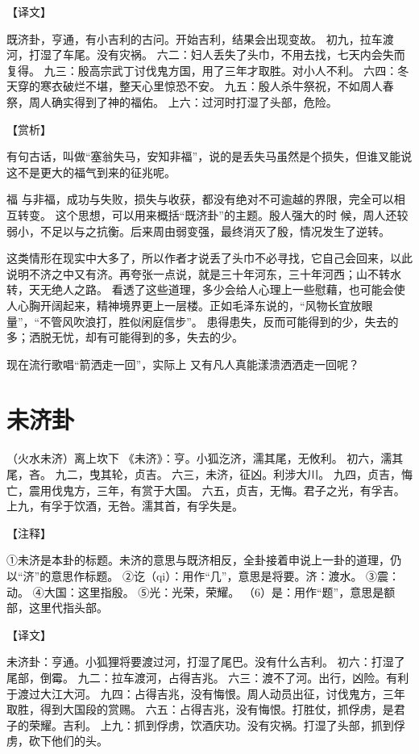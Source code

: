 \documentclass[12pt,UTF8]{ctexbook}
\begin{document}
【译文】

既济卦，亨通，有小吉利的古问。开始吉利，结果会出现变故。
初九，拉车渡河，打湿了车尾。没有灾祸。
六二：妇人丢失了头巾，不用去找，七天内会失而复得。
九三：殷高宗武丁讨伐鬼方国，用了三年才取胜。对小人不利。
六四：冬天穿的寒衣破烂不堪，整天心里惊恐不安。
九五：殷人杀牛祭祝，不如周人春祭，周人确实得到了神的福佑。
上六：过河时打湿了头部，危险。

【赏析】

有句古话，叫做“塞翁失马，安知非福”，说的是丢失马虽然是个损失，但谁叉能说这不是更大的福气到来的征兆呢。

福 与非福，成功与失败，损失与收获，都没有绝对不可逾越的界限，完全可以相互转变。 这个思想，可以用来概括“既济卦”的主题。殷人强大的时 候，周人还较弱小，不足以与之抗衡。后来周由弱变强，最终消灭了殷，情况发生了逆转。

这类情形在现实中大多了，所以作者才说丢了头巾不必寻找，它自己会回来，以此说明不济之中又有济。再夸张一点说，就是三十年河东，三十年河西；山不转水转，天无绝人之路。 看透了这些道理，多少会给人心理上一些慰藉，也可能会使人心胸开阔起来，精神境界更上一层楼。正如毛泽东说的，“风物长宜放眼量”，“不管风吹浪打，胜似闲庭信步”。 患得患失，反而可能得到的少，失去的多；洒脱无忧，却有可能得到的多，失去的少。

现在流行歌唱“箭洒走一回”，实际上 又有凡人真能漾溃洒洒走一回呢？

\chapter{未济卦}

（火水未济）离上坎下
《未济》：亨。小狐汔济，濡其尾，无攸利。
初六，濡其尾，吝。
九二，曳其轮，贞吉。
六三，未济，征凶。利涉大川。
九四，贞吉，悔亡，震用伐鬼方，三年，有赏于大国。
六五，贞吉，无悔。君子之光，有孚吉。
上九，有孚于饮酒，无咎。濡其首，有孚失是。

【注释】

①未济是本卦的标题。未济的意思与既济相反，全卦接着申说上一卦的道理，仍以“济”的意思作标题。
②讫（qi）：用作“几”，意思是将要。济：渡水。
③震：动。
④大国：这里指殷。
⑤光：光荣，荣耀。
（6）是：用作“题”，意思是额部，这里代指头部。

【译文】

未济卦：亨通。小狐狸将要渡过河，打湿了尾巴。没有什么吉利。
初六：打湿了尾部，倒霉。
九二：拉车渡河，占得吉兆。
六三：渡不了河。出行，凶险。有利于渡过大江大河。
九四：占得吉兆，没有悔恨。周人动员出征，讨伐鬼方，三年取胜，得到大国段的赏赐。
六五：占得吉兆，没有悔恨。打胜仗，抓俘虏，是君子的荣耀。吉利。
上九：抓到俘虏，饮酒庆功。没有灾祸。打湿了头部，抓到俘虏，砍下他们的头。
\end{document}
